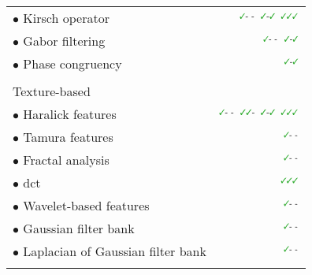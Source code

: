 \begin{table}
\begin{tabular}{l r}
  \quad \quad \quad $\bullet$ Kirsch operator & $^{\text{{\cmarksmall}- -}}$\cite{Tiwari2009a,Tiwari2010,Tiwari2013,Viswanath2008,Viswanath2009,Viswanath2011,Viswanath2012} $^{\text{{\cmarksmall}-{\cmarksmall}}}$\cite{khalvati2015automated,chung2015prostate,Lemaitre2016thesis}  $^{\text{{\cmarksmall}{\cmarksmall}{\cmarksmall}}}$\cite{Niaf2011,Niaf2012,lehaire2014computer} \\
  \quad \quad \quad $\bullet$ Gabor filtering & $^{\text{{\cmarksmall}-
                                                -}}$\cite{Tiwari2012,Viswanath2008,Viswanath2012}
                                                $^{\text{{\cmarksmall}-{\cmarksmall}}}$\cite{khalvati2015automated,chung2015prostate,Lemaitre2016thesis}
    \\
  \quad \quad \quad $\bullet$ Phase congruency & $^{\text{{\cmarksmall}-{\cmarksmall}}}$\cite{Lemaitre2016thesis}  \\ \\ [-1.5ex]
  \quad \quad Texture-based & \\
  \quad \quad \quad $\bullet$ Haralick features & $^{\text{{\cmarksmall}- -}}$\cite{Antic2013,Tiwari2009a,Tiwari2010,Tiwari2013,Viswanath2008,Viswanath2009,Viswanath2012,trigui2016classification,rampun2015computer,rampun2016computer,rampun2016quantitative} $^{\text{{\cmarksmall}{\cmarksmall}-}}$\cite{Viswanath2011} $^{\text{{\cmarksmall}-{\cmarksmall}}}$\cite{cameron2014multiparametric,cameron2016maps,khalvati2015automated,chung2015prostate} $^{\text{{\cmarksmall}{\cmarksmall}{\cmarksmall}}}$\cite{Litjens2012,Niaf2011,Niaf2012,lehaire2014computer} \\
  \quad \quad \quad $\bullet$ Tamura features & $^{\text{{\cmarksmall}- -}}$\cite{rampun2016computer,rampun2016quantitative,rampun2015computer} \\
  \quad \quad \quad $\bullet$ Fractal analysis & $^{\text{{\cmarksmall}- -}}$\cite{Lopes2011,Lv2009} \\
  \quad \quad \quad $\bullet$ \acs*{dct} & $^{\text{{\cmarksmall}{\cmarksmall}{\cmarksmall}}}$\cite{Chan2003} \\
  \quad \quad \quad $\bullet$ Wavelet-based features & $^{\text{{\cmarksmall}- -}}$\cite{Viswanath2012} \\
  \quad \quad \quad $\bullet$ Gaussian filter bank & $^{\text{{\cmarksmall}- -}}$\cite{Litjens2014,rampun2016computer,rampun2016quantitative,rampun2015computer} \\
  \quad \quad \quad $\bullet$ Laplacian of Gaussian filter bank & $^{\text{{\cmarksmall}- -}}$\cite{rampun2016computer,rampun2016quantitative,rampun2015computer} \\ \\ [-1.5ex]

\end{tabular}
\end{table}
